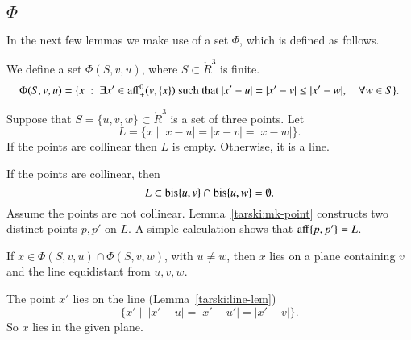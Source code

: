 \begin{tarskidata}
\begin{tarski}
\section{$\Phi$}


In the next few lemmas we make use of a set
$\Phi$, which is defined as follows.
\begin{definition}[$\Phi$]
We define a set $\Phi(S,v,u)$, where $S\subset\ring{R}^3$ is finite.
$$
\Phi(S,v,u) = \{x \ :\  \exists x'\in{\operatorname{aff}}_+^0(v,\{x\}) \hbox{ such that }
  |x'-u|=|x'-v|\le |x'-w|,\quad\forall w\in S\}.
$$
\end{definition}
\end{tarski}

\begin{tarski}

\begin{lemma}
Suppose that $S=\{u,v,w\}\subset \ring{R}^3$ is a set of three points.
Let 
$$
L = \{x \mid |x-u| = |x-v| = |x-w|\}.
$$
If the points are collinear then $L$ is empty.  Otherwise, it is a line.
\end{lemma}

\begin{proved} 
If the points are collinear, then
$$
L\subset {\operatorname{bis}}\{u,v\} \cap {\operatorname{bis}}\{u,w\}=\emptyset.
$$
Assume the points are not collinear.  
Lemma~\ref{tarski:mk-point} constructs two distinct points $p,p'$ on $L$. 
A simple calculation shows
that ${\operatorname{aff}}\{p,p'\}=L$. 
\swallowed\end{proved}
\end{tarski}

\begin{tarski}

\begin{lemma}
If $x\in\Phi(S,v,u)\cap\Phi(S,v,w)$,
with $u\ne w$, then
   $x$ lies on a plane containing $v$ and the line equidistant
from $u,v,w$.  
\end{lemma}

\begin{proved}  The point $x'$ lies on the line (Lemma~\ref{tarski:line-lem})
   $$\{x' \mid \ |x'-u|=|x'-u'|=|x'-v|\}.$$
So $x$ lies in the given plane.
\swallowed\end{proved}
\end{tarski}







\end{tarskidata}
